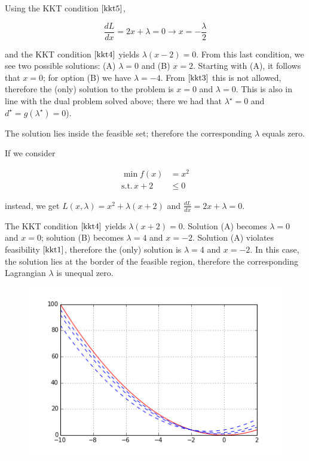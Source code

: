 Using the KKT condition $\eqref{kkt5}$,

\[
\frac{dL}{dx} = 2x + \lambda = 0 \rightarrow x = - \frac{\lambda}{2}
\]

and the KKT condition $\eqref{kkt4}$ yields $\lambda(x-2) = 0$. From this last condition, we see two possible solutions: (A) $\lambda = 0 $ and (B) $x=2$. Starting with (A), it follows that $x=0$; for option (B) we have $\lambda=-4$. From $\eqref{kkt3}$ this is not allowed, therefore the (only) solution to the problem is $x=0$ and $\lambda=0$. This is also in line with the dual problem solved above; there we had that $\lambda^\star = 0$ and $d^\star = g(\lambda^\star)=0$).

The solution lies inside the feasible set; therefore the corresponding $\lambda$ equals zero.

If we consider


\begin{align*}
\min f(x) &= x^2 \\
\text{s.t.} \, x+2 & \leq 0
\end{align*}


instead, we get $L(x,\lambda) = x^2 + \lambda (x+2)$ and $\frac{dL}{dx} = 2x + \lambda = 0$.

The KKT condition $\eqref{kkt4}$ yields $\lambda(x+2) = 0$. Solution (A) becomes $\lambda = 0$ and $x=0$; solution (B) becomes $\lambda = 4$ and $x=-2$. Solution (A) violates feasibility $\eqref{kkt1}$, therefore the (only) solution is $\lambda = 4$ and $x=-2$. In this case, the solution lies at the border of the feasible region, therefore the corresponding Lagrangian $\lambda$ is unequal zero.

\begin{figure}[H]
\includegraphics[scale=0.7]{images/convex_opt_04.png}
\end{figure}

